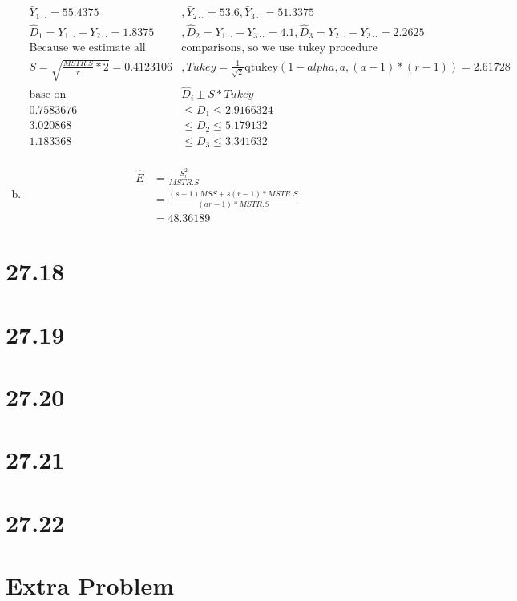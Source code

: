 \documentclass{article}\usepackage[]{graphicx}\usepackage[]{color}
\begin{document}
\begin{enumerate}[(a)]
\begin{displaymath}
\begin{split}
\bar{Y}_{1\cdot \cdot} = 55.4375 &, \bar{Y}_{2\cdot \cdot} = 53.6 , \bar{Y}_{3\cdot \cdot} = 51.3375 \\
\hat{D}_1 = \bar{Y}_{1\cdot \cdot}-\bar{Y}_{2\cdot \cdot} = 1.8375 &,  \hat{D}_2 = \bar{Y}_{1\cdot \cdot}-\bar{Y}_{3\cdot \cdot}=4.1  , \hat{D}_3 = \bar{Y}_{2\cdot \cdot}-\bar{Y}_{3\cdot \cdot}=2.2625  \\
\text{Because we estimate all pairwise }& \text{comparisons, so we use tukey procedure}\\
S = \sqrt{\frac{MSTR.S}{r}*2} = 0.4123106 &, Tukey = \frac{1}{\sqrt{2}}\text{qtukey}(1-alpha, a, (a-1)*(r-1))=2.61728\\
\text{base on } &\hat{D}_i \pm S*Tukey\\
0.7583676 & \leq D_1 \leq 2.9166324  \\
3.020868 &\leq D_2 \leq 5.179132  \\
1.183368 &\leq D_3 \leq 3.341632   \\
\end{split}
\end{displaymath}

\item

\begin{displaymath}
\begin{split}
\hat{E} &= \frac{S_r^2}{MSTR.S} \\
        &= \frac{(s-1)MSS+s(r-1)*MSTR.S}{(ar-1)*MSTR.S}\\
        &= 48.36189
\end{split}
\end{displaymath}

\end{enumerate}

\section{27.18}

\section{27.19}

\section{27.20}

\section{27.21}

\section{27.22}

\section{Extra Problem}
\end{document}
